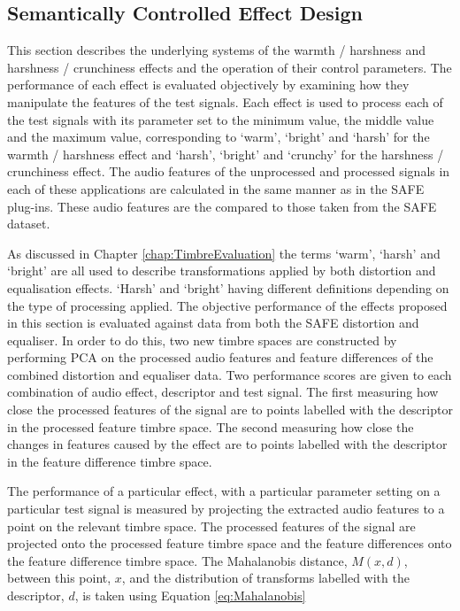 	\subsection{Semantically Controlled Effect Design}
	\label{sec:PerceptualExperiments-SemanticControl-EffectDesign}
		This section describes the underlying systems of the warmth / harshness and harshness / crunchiness effects
		and the operation of their control parameters. The performance of each effect is evaluated objectively by
		examining how they manipulate the features of the test signals. Each effect is used to process each of the
		test signals with its parameter set to the minimum value, the middle value and the maximum value,
		corresponding to `warm', `bright' and `harsh' for the warmth / harshness effect and `harsh', `bright' and
		`crunchy' for the harshness / crunchiness effect. The audio features of the unprocessed and processed
		signals in each of these applications are calculated in the same manner as in the SAFE plug-ins. These audio
		features are the compared to those taken from the SAFE dataset.

		As discussed in Chapter \ref{chap:TimbreEvaluation} the terms `warm', `harsh' and `bright' are all used to
		describe transformations applied by both distortion and equalisation effects. `Harsh' and `bright' having
		different definitions depending on the type of processing applied. The objective performance of the effects
		proposed in this section is evaluated against data from both the SAFE distortion and equaliser. In order to
		do this, two new timbre spaces are constructed by performing PCA on the processed audio features and feature
		differences of the combined distortion and equaliser data. Two performance scores are given to each
		combination of audio effect, descriptor and test signal. The first measuring how close the processed
		features of the signal are to points labelled with the descriptor in the processed feature timbre space.
		The second measuring how close the changes in features caused by the effect are to points labelled with the
		descriptor in the feature difference timbre space.

		The performance of a particular effect, with a particular parameter setting on a particular test signal is
		measured by projecting the extracted audio features to a point on the relevant timbre space. The processed
		features of the signal are projected onto the processed feature timbre space and the feature differences
		onto the feature difference timbre space. The Mahalanobis distance, $M(x, d)$, between this point, $x$, and
		the distribution of transforms labelled with the descriptor, $d$, is taken using Equation
		\ref{eq:Mahalanobis}
		
